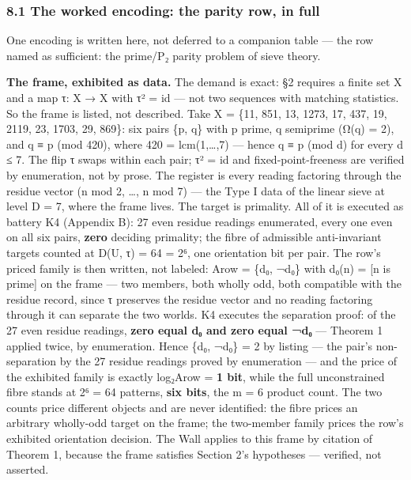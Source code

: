 \documentclass[10pt]{article}
\renewcommand{\_}{\origunderscore\allowbreak}
\begin{document}
\hypertarget{the-worked-encoding-the-parity-row-in-full}{%
\subsubsection{8.1 The worked encoding: the parity row, in
full}\label{the-worked-encoding-the-parity-row-in-full}}

One encoding is written here, not deferred to a companion table --- the
row named as sufficient: the prime/P₂ parity problem of sieve theory.

\textbf{The frame, exhibited as data.} The demand is exact: §2 requires
a finite set X and a map τ: X → X with τ² = id --- not two sequences
with matching statistics. So the frame is listed, not described. Take X
= \{11, 851, 13, 1273, 17, 437, 19, 2119, 23, 1703, 29, 869\}: six pairs
\{p, q\} with p prime, q semiprime (Ω(q) = 2), and q ≡ p (mod 420),
where 420 = lcm(1,\ldots,7) --- hence q ≡ p (mod d) for every d ≤ 7. The
flip τ swaps within each pair; τ² = id and fixed-point-freeness are
verified by enumeration, not by prose. The register is every reading
factoring through the residue vector (n mod 2, \ldots, n mod 7) --- the
Type I data of the linear sieve at level D = 7, where the frame lives.
The target is primality. All of it is executed as battery K4 (Appendix
B): 27 even residue readings enumerated, every one even on all six
pairs, \textbf{zero} deciding primality; the fibre of admissible
anti-invariant targets counted at \textbar D(U, τ)\textbar{} = 64 = 2⁶,
one orientation bit per pair. The row's priced family is then written,
not labeled: A\_row = \{d₀, ¬d₀\} with d₀(n) = {[}n is prime{]} on the
frame --- two members, both wholly odd, both compatible with the residue
record, since τ preserves the residue vector and no reading factoring
through it can separate the two worlds. K4 executes the separation
proof: of the 27 even residue readings, \textbf{zero equal d₀ and zero
equal ¬d₀} --- Theorem 1 applied twice, by enumeration. Hence
\textbar\{d₀, ¬d₀\}\textbar{} = 2 by listing --- the pair's
non-separation by the 27 residue readings proved by enumeration --- and
the price of the exhibited family is exactly
log₂\textbar A\_row\textbar{} = \textbf{1 bit}, while the full
unconstrained fibre stands at 2⁶ = 64 patterns, \textbf{six bits}, the m
= 6 product count. The two counts price different objects and are never
identified: the fibre prices an arbitrary wholly-odd target on the
frame; the two-member family prices the row's exhibited orientation
decision. The Wall applies to this frame by citation of Theorem 1,
because the frame satisfies Section 2's hypotheses --- verified, not
asserted.
\end{document}
